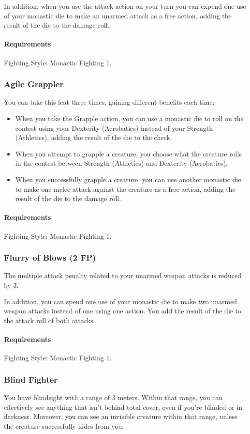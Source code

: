     In addition, when you use the attack action on your turn you can expend one use of your monastic die to make an unarmed attack as a free action, adding the result of the die to the damage roll.
    \paragraph{Requirements} Fighting Style: Monastic Fighting 1.
\subsubsection{Agile Grappler} \label{feat::agilegrappler}
    You can take this feat three times, gaining different benefits each time:
    \begin{itemize}
        \item When you take the Grapple action, you can use a monastic die to roll on the contest using your Dexterity (Acrobatics) instead of your Strength (Athletics), adding the result of the die to the check.
        \item When you attempt to grapple a creature, you choose what the creature rolls in the contest between Strength (Athletics) and Dexterity (Acrobatics).
        \item When you successfully grapple a creature, you can use another monastic die to make one melee attack against the creature as a free action, adding the result of the die to the damage roll.
    \end{itemize}
    \paragraph{Requirements} Fighting Style: Monastic Fighting 1.
\subsubsection{Flurry of Blows (2 FP)} \label{feat::flurryofblows}
    The multiple attack penalty related to your unarmed weapon attacks is reduced by 3.

    In addition, you can spend one use of your monastic die to make two unarmed weapon attacks instead of one using one action.
    You add the result of the die to the attack roll of both attacks.
    \paragraph{Requirements} Fighting Style: Monastic Fighting 1.
\subsubsection{Blind Fighter} \label{feat::blindfighter}
    You have blindsight with a range of 3 meters.
    Within that range, you can effectively see anything that isn't behind total cover, even if you're blinded or in darkness.
    Moreover, you can see an invisible creature within that range, unless the creature successfully hides from you.
